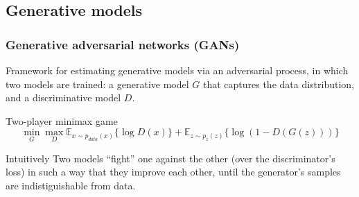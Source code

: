 \documentclass[t]{beamer}
\begin{document}
\subsection{Generative models}

\begin{frame}
\frametitle{Generative adversarial networks (GANs)}
Framework for estimating generative models via an adversarial
process, in which two models are trained: a generative model $G$ that captures
the data distribution, and a discriminative model $D$.

\begin{block}{Two-player minimax game}
\[
\min_G \max_D \mathbb{E}_{x \sim p_{data}(x)}\{\log D(x)\} +
\mathbb{E}_{z \sim p_z(z)} \{\log(1 - D(G(z)))\}
\]
\end{block}\pause

\begin{block}{Intuitively}
Two models ``fight'' one against the other (over the discriminator's loss)
in such a way that they improve each other, until the generator's samples are
indistiguishable from data.
\end{block}

\end{frame}
\end{document}
